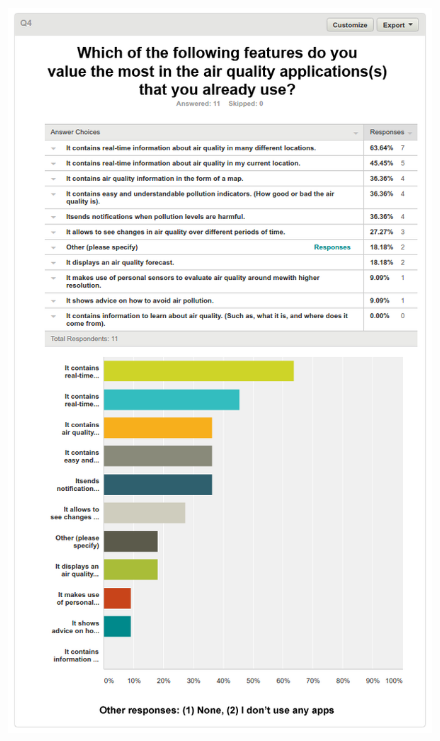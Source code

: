 \begin{figure}[H]
\begin{adjustbox}{width=1\textwidth,center=\textwidth}
  \centering
  \includegraphics[scale=1]{surveys/q4.png}
\end{adjustbox}
\end{figure}
